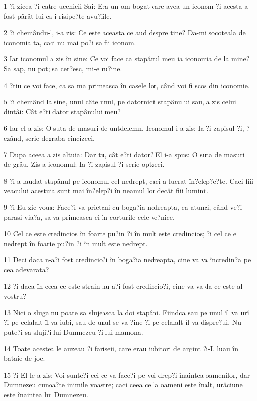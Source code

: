 \par 1 ?i zicea ?i catre ucenicii Sai: Era un om bogat care avea un iconom ?i acesta a fost pârât lui ca-i risipe?te avu?iile.
\par 2 ?i chemându-l, i-a zis: Ce este aceasta ce aud despre tine? Da-mi socoteala de iconomia ta, caci nu mai po?i sa fii iconom.
\par 3 Iar iconomul a zis în sine: Ce voi face ca stapânul meu ia iconomia de la mine? Sa sap, nu pot; sa cer?esc, mi-e ru?ine.
\par 4 ?tiu ce voi face, ca sa ma primeasca în casele lor, când voi fi scos din iconomie.
\par 5 ?i chemând la sine, unul câte unul, pe datornicii stapânului sau, a zis celui dintâi: Cât e?ti dator stapânului meu?
\par 6 Iar el a zis: O suta de masuri de untdelemn. Iconomul i-a zis: Ia-?i zapisul ?i, ?ezând, scrie degraba cincizeci.
\par 7 Dupa aceea a zis altuia: Dar tu, cât e?ti dator? El i-a spus: O suta de masuri de grâu. Zis-a iconomul: Ia-?i zapisul ?i scrie optzeci.
\par 8 ?i a laudat stapânul pe iconomul cel nedrept, caci a lucrat în?elep?e?te. Caci fiii veacului acestuia sunt mai în?elep?i în neamul lor decât fiii luminii.
\par 9 ?i Eu zic voua: Face?i-va prieteni cu boga?ia nedreapta, ca atunci, când ve?i parasi via?a, sa va primeasca ei în corturile cele ve?nice.
\par 10 Cel ce este credincios în foarte pu?in ?i în mult este credincios; ?i cel ce e nedrept în foarte pu?in ?i în mult este nedrept.
\par 11 Deci daca n-a?i fost credincio?i în boga?ia nedreapta, cine va va încredin?a pe cea adevarata?
\par 12 ?i daca în ceea ce este strain nu a?i fost credincio?i, cine va va da ce este al vostru?
\par 13 Nici o sluga nu poate sa slujeasca la doi stapâni. Fiindca sau pe unul îl va urî ?i pe celalalt îl va iubi, sau de unul se va ?ine ?i pe celalalt îl va dispre?ui. Nu pute?i sa sluji?i lui Dumnezeu ?i lui mamona.
\par 14 Toate acestea le auzeau ?i fariseii, care erau iubitori de argint ?i-L luau în bataie de joc.
\par 15 ?i El le-a zis: Voi sunte?i cei ce va face?i pe voi drep?i înaintea oamenilor, dar Dumnezeu cunoa?te inimile voastre; caci ceea ce la oameni este înalt, urâciune este înaintea lui Dumnezeu.
